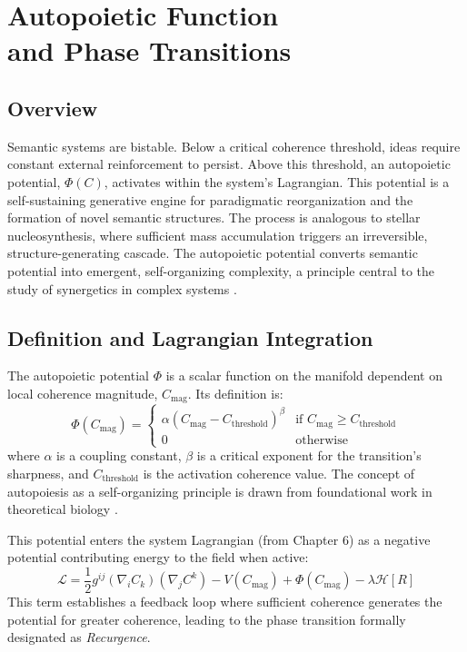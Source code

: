 \chapter{Autopoietic Function \\ and Phase Transitions}

\section{Overview}

Semantic systems are bistable. Below a critical coherence threshold, ideas require constant external reinforcement to persist. Above this threshold, an autopoietic potential, \(\Phi(C)\), activates within the system's Lagrangian. This potential is a self-sustaining generative engine for paradigmatic reorganization and the formation of novel semantic structures. The process is analogous to stellar nucleosynthesis, where sufficient mass accumulation triggers an irreversible, structure-generating cascade. The autopoietic potential converts semantic potential into emergent, self-organizing complexity, a principle central to the study of synergetics in complex systems \autocite{Haken1983}.

\section{Definition and Lagrangian Integration}

The autopoietic potential \(\Phi\) is a scalar function on the manifold dependent on local coherence magnitude, \(C_{\mathrm{mag}}\). Its definition is:
\begin{equation}
\Phi(C_{\mathrm{mag}}) =
\begin{cases}
\alpha (C_{\mathrm{mag}} - C_{\text{threshold}})^{\beta} & \text{if } C_{\mathrm{mag}} \geq C_{\text{threshold}} \\
0 & \text{otherwise}
\end{cases}
\end{equation}
where \(\alpha\) is a coupling constant, \(\beta\) is a critical exponent for the transition's sharpness, and \(C_{\text{threshold}}\) is the activation coherence value. The concept of autopoiesis as a self-organizing principle is drawn from foundational work in theoretical biology \autocite{MaturanaVarela1980}.

This potential enters the system Lagrangian (from Chapter 6) as a negative potential contributing energy to the field when active:
\begin{equation}
\mathcal{L} = \frac{1}{2} g^{ij} (\nabla_i C_k)(\nabla_j C^k) - V(C_{\mathrm{mag}}) + \Phi(C_{\mathrm{mag}}) - \lambda \mathcal{H}[R]
\end{equation}
This term establishes a feedback loop where sufficient coherence generates the potential for greater coherence, leading to the phase transition formally designated as \textit{Recurgence}.

